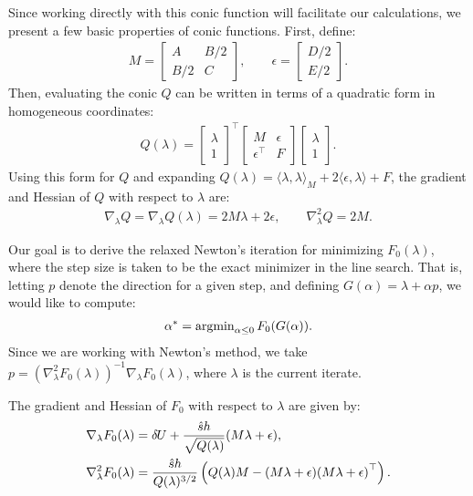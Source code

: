\documentclass[eikonal.tex]{subfiles}
\begin{document}
Since working directly with this conic function will facilitate our
calculations, we present a few basic properties of conic
functions. First, define:
\begin{align*}
  M = \begin{bmatrix} A & B/2 \\ B/2 & C \end{bmatrix}, \qquad \epsilon = \begin{bmatrix} D/2 \\ E/2 \end{bmatrix}.
\end{align*}
Then, evaluating the conic $Q$ can be written in terms of a quadratic
form in homogeneous coordinates:
\begin{align*}
  Q(\lambda) = \begin{bmatrix} \lambda \\ 1 \end{bmatrix}^\top \begin{bmatrix}
    M & \epsilon \\ \epsilon^\top & F \end{bmatrix} \begin{bmatrix} \lambda \\ 1 \end{bmatrix}.
\end{align*}
Using this form for $Q$ and expanding
$Q(\lambda) = \langle \lambda, \lambda \rangle_M + 2 \langle \epsilon,
\lambda \rangle + F$, the gradient and Hessian of $Q$ with respect to
$\lambda$ are:
\begin{align*}
  \nabla_\lambda Q = \nabla_\lambda Q(\lambda) = 2M\lambda + 2\epsilon, \qquad \nabla_\lambda^2 Q = 2M.
\end{align*}

Our goal is to derive the relaxed Newton's iteration for minimizing
$F_0(\lambda)$, where the step size is taken to be the exact minimizer
in the line search. That is, letting $p$ denote the direction for a
given step, and defining $G(\alpha) = \lambda + \alpha p$, we would
like to compute:
\begin{align*}
  \alpha^* = \operatorname{argmin}_{\alpha \leq 0} F_0(G(\alpha)).
\end{align*}
Since we are working with Newton's method, we take
$p = {(\nabla_\lambda^2F_0(\lambda))}^{-1} \nabla_\lambda F_0(\lambda)$,
where $\lambda$ is the current iterate.

\begin{lemma}
  The gradient and Hessian of $F_0$ with respect to $\lambda$ are given
  by:
  \begin{align*}
    \nabla_\lambda F_0(\lambda) &= {\delta \hspace{-0.09em} U} + \frac{\hat{s} h}{\sqrt{Q(\lambda)}} {(M\lambda + \epsilon)}, \\
    \nabla_\lambda^2 F_0(\lambda) &= \frac{\hat{s}h}{Q(\lambda)^{3/2}} \left(Q(\lambda) M - {(M\lambda + \epsilon)}{(M\lambda + \epsilon)}^\top\right).
  \end{align*}
\end{lemma}
\end{document}
